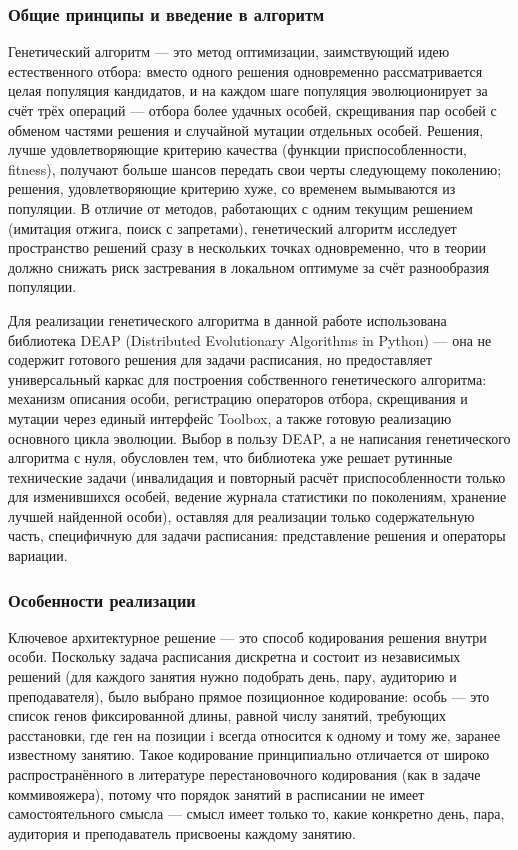 
\subsubsection{Общие принципы и введение в алгоритм}

Генетический алгоритм — это метод оптимизации, заимствующий идею естественного отбора: вместо одного решения одновременно рассматривается целая популяция кандидатов, и на каждом шаге популяция эволюционирует за счёт трёх операций — отбора более удачных особей, скрещивания пар особей с обменом частями решения и случайной мутации отдельных особей. Решения, лучше удовлетворяющие критерию качества (функции приспособленности, fitness), получают больше шансов передать свои черты следующему поколению; решения, удовлетворяющие критерию хуже, со временем вымываются из популяции. В отличие от методов, работающих с одним текущим решением (имитация отжига, поиск с запретами), генетический алгоритм исследует пространство решений сразу в нескольких точках одновременно, что в теории должно снижать риск застревания в локальном оптимуме за счёт разнообразия популяции.

Для реализации генетического алгоритма в данной работе использована библиотека DEAP (Distributed Evolutionary Algorithms in Python) — она не содержит готового решения для задачи расписания, но предоставляет универсальный каркас для построения собственного генетического алгоритма: механизм описания особи, регистрацию операторов отбора, скрещивания и мутации через единый интерфейс Toolbox, а также готовую реализацию основного цикла эволюции. Выбор в пользу DEAP, а не написания генетического алгоритма с нуля, обусловлен тем, что библиотека уже решает рутинные технические задачи (инвалидация и повторный расчёт приспособленности только для изменившихся особей, ведение журнала статистики по поколениям, хранение лучшей найденной особи), оставляя для реализации только содержательную часть, специфичную для задачи расписания: представление решения и операторы вариации.

\subsubsection {Особенности реализации}

Ключевое архитектурное решение — это способ кодирования решения внутри особи. Поскольку задача расписания дискретна и состоит из независимых решений (для каждого занятия нужно подобрать день, пару, аудиторию и преподавателя), было выбрано прямое позиционное кодирование: особь — это список генов фиксированной длины, равной числу занятий, требующих расстановки, где ген на позиции i всегда относится к одному и тому же, заранее известному занятию. Такое кодирование принципиально отличается от широко распространённого в литературе перестановочного кодирования (как в задаче коммивояжера), потому что порядок занятий в расписании не имеет самостоятельного смысла — смысл имеет только то, какие конкретно день, пара, аудитория и преподаватель присвоены каждому занятию.

